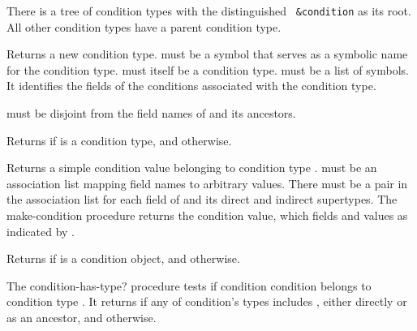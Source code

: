 There is a tree of condition types with the distinguished {\tt
  \&condition} as its root. All other condition types have a parent
condition type.

\begin{entry}{%
}

Returns a new condition type.  must
be a symbol that serves as a symbolic name for the condition type.
 must itself be a condition type.  must
be a list of symbols. It identifies the fields of the conditions
associated with the condition type.

 must be disjoint from the field names of
 and its ancestors. 
\end{entry}

\begin{entry}{%
}

Returns \schtrue{} if  is a condition type, and \schfalse{}
otherwise.
\end{entry}

\begin{entry}{%
}

Returns a simple condition value belonging to condition
type .  must be an association list mapping
field names to arbitrary values.  There must be a pair in the
association list for each field of  and its direct and indirect
supertypes. The {\cf make-condition} procedure returns the condition
value, which fields and values as indicated by .
\end{entry}

\begin{entry}{%
}

Returns \schtrue{} if  is a condition object, and \schfalse{}
otherwise.
\end{entry}

\begin{entry}{%
}

The {\cf condition-has-type?} procedure tests if condition condition belongs to
condition type . It returns \schtrue{} if any of
condition's types includes , either directly or as
an ancestor, and \schfalse{} otherwise.
\end{entry}

